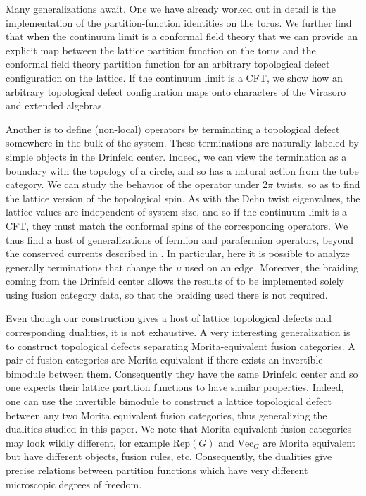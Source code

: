 Many generalizations await. 
One we have already worked out in detail is the implementation of the partition-function identities on the torus. 
We further find that when the continuum limit is a conformal field theory that we can provide an explicit map between the lattice partition function on the torus and the conformal field theory partition function for an arbitrary topological defect configuration on the lattice.
If the continuum limit is a CFT, we show how an arbitrary topological defect configuration maps onto characters of the Virasoro and extended algebras.

Another is to define (non-local) operators by terminating a topological defect somewhere in the bulk of the system. 
These terminations are naturally labeled by simple objects in the Drinfeld center. 
Indeed, we can view the termination as a boundary with the topology of a circle, and so has a natural action from the tube category.
We can study the behavior of the operator under 2$\pi$ twists, so as to find the lattice version of the topological spin. 
As with the Dehn twist eigenvalues, the lattice values are independent of system size, and so if the continuum limit is a CFT, they must match the conformal spins of the corresponding operators. 
We thus find a host of generalizations of fermion and parafermion operators, beyond the conserved currents described in \cite{Fendley2020}. 
In particular, here it is possible to analyze generally terminations that change the $\upsilon$ used on an edge. 
Moreover, the braiding coming from the Drinfeld center allows the results of  \cite{Fendley2020} to be implemented solely using fusion category data, so that the braiding used there is not required.

Even though our construction gives a host of lattice topological defects and corresponding dualities, it is not exhaustive. 
A very interesting generalization is to construct topological defects separating Morita-equivalent fusion categories.
A pair of fusion categories are Morita equivalent if there exists an invertible bimodule between them. 
Consequently they have the same Drinfeld center and so one expects their lattice partition functions to have similar properties. 
Indeed, one can use the invertible bimodule to construct a lattice topological defect between any two Morita equivalent fusion categories, thus generalizing the dualities studied in this paper.
We note that Morita-equivalent fusion categories may look wildly different, for example $\text{Rep}(G)$ and $\text{Vec}_G$ are Morita equivalent but have different objects, fusion rules, etc.
Consequently, the dualities give precise relations between partition functions which have very different microscopic degrees of freedom.


